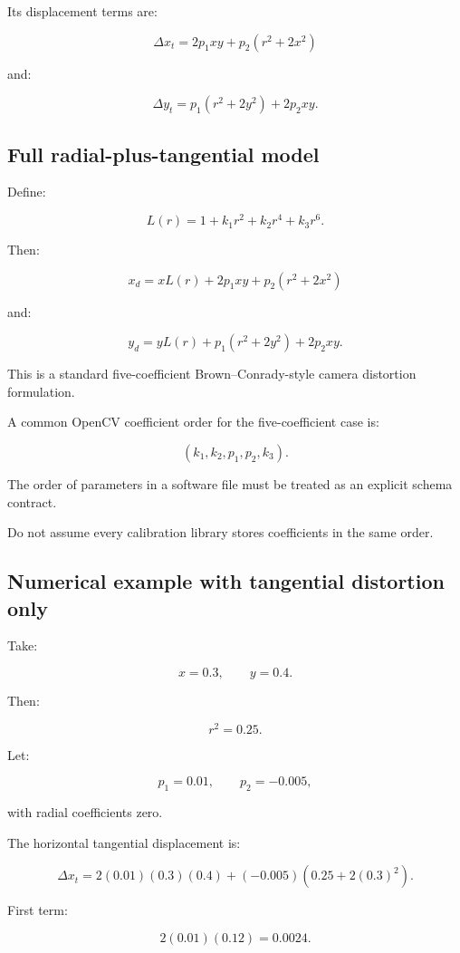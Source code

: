 Its displacement terms are:

\[
 \boxed{ \Delta x_t= 2p_1xy+p_2(r^2+2x^2) }
\]

and:

\[
 \boxed{ \Delta y_t= p_1(r^2+2y^2)+2p_2xy }.
\]

\subsection{Full radial-plus-tangential model}\label{02-foundations-ii-ch035-full-radial-plus-tangential-model}

Define:

\[
 L(r)=1+k_1r^2+k_2r^4+k_3r^6.
\]

Then:

\[
 \boxed{ x_d= xL(r)+2p_1xy+p_2(r^2+2x^2) }
\]

and:

\[
 \boxed{ y_d= yL(r)+p_1(r^2+2y^2)+2p_2xy }.
\]

This is a standard five-coefficient Brown--Conrady-style camera distortion formulation.

A common OpenCV coefficient order for the five-coefficient case is:

\[
 \boxed{ (k_1,k_2,p_1,p_2,k_3) }.
\]

The order of parameters in a software file must be treated as an explicit schema contract.

Do not assume every calibration library stores coefficients in the same order.

\subsection{Numerical example with tangential distortion only}\label{02-foundations-ii-ch035-numerical-example-with-tangential-distortion-only}

Take:

\[
 x=0.3,\qquad y=0.4.
\]

Then:

\[
 r^2=0.25.
\]

Let:

\[
 p_1=0.01,\qquad p_2=-0.005,
\]

with radial coefficients zero.

The horizontal tangential displacement is:

\[
 \Delta x_t= 2(0.01)(0.3)(0.4) +(-0.005)(0.25+2(0.3)^2).
\]

First term:

\[
 2(0.01)(0.12)=0.0024.
\]

